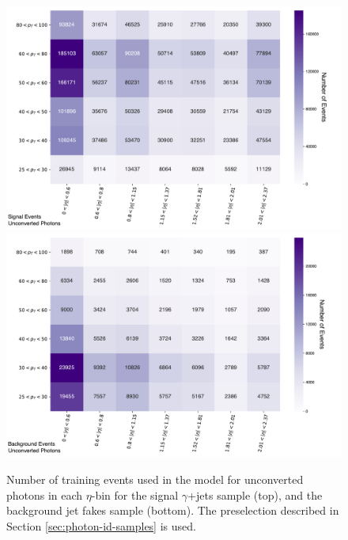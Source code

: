 \begin{figure}[!thp]
    \centering
    \includegraphics[width=.85\textwidth]{chapters/chapter4_photonID/images/sig_events.pdf}
    \includegraphics[width=.85\textwidth]{chapters/chapter4_photonID/images/bkg_events.pdf}
    \caption[Number of training events used in the model for unconverted photons in each $\eta$-\pt bin for the signal $\gamma$+jets sample, and the background jet fakes sample]{Number of training events used in the model for unconverted photons in each $\eta$-\pt bin for the signal $\gamma$+jets sample (top), and the background jet fakes sample (bottom). The preselection described in Section \ref{sec:photon-id-samples} is used.}
    \label{fig:photonid-events}
\end{figure}
